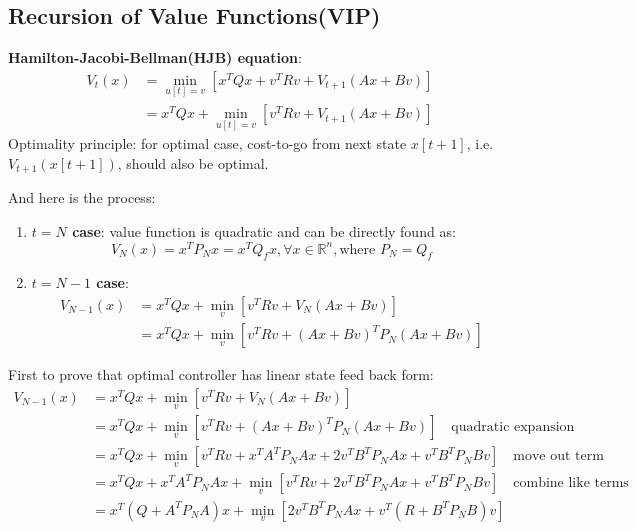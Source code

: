 \documentclass[10pt,a4paper,oneside]{article}
\begin{document}
\subsection{Recursion of Value Functions(VIP)}
\textbf{Hamilton-Jacobi-Bellman(HJB) equation}:
\[
\begin{aligned}
V_t(x) &= \min_{u[t]=v}[x^TQx+v^TRv+V_{t+1}(Ax+Bv)]\\
&= x^TQx+\min_{u[t]=v}[v^TRv+V_{t+1}(Ax+Bv)]
\end{aligned}
\]
Optimality principle: for optimal case, cost-to-go from next state $x[t+1]$, i.e. $V_{t+1}(x[t+1])$, should also be optimal. \\
And here is the process:
\begin{enumerate}
	\item \textbf{$t=N$ case}: value function is quadratic and can be directly found as:
	\[
	V_N(x)=x^T P_N x = x^T Q_f x,\forall x\in \mathbb{R}^n,\text{where }P_N=Q_f
	\]
	\item \textbf{$t=N-1$ case}:
	\[
	\begin{aligned}
	V_{N-1}(x) &= x^T Q x + \min_{v}[v^T R v+V_N(Ax+Bv)]\\
	&= x^T Q x + \min_{v}[v^T R v+(Ax+Bv)^T P_N (Ax+Bv)]
	\end{aligned}
	\]
\end{enumerate}
First to prove that optimal controller has linear state feed back form:
\begin{align*}
V_{N-1}(x) &= x^T Q x + \min_{v}[v^T R v+V_N(Ax+Bv)]\\
&= x^T Q x + \min_{v}[v^T R v+(Ax+Bv)^T P_N (Ax+Bv)] \quad \text{quadratic expansion}\\
&= x^T Q x + \min_{v}[v^T R v+ x^TA^TP_NAx + 2v^TB^TP_NAx + v^TB^TP_NBv] \quad \text{move out term}\\
&=  x^T Q x + x^TA^TP_NAx + \min_{v}[v^T R v  + 2v^TB^TP_NAx + v^TB^TP_NBv] \quad \text{combine like terms}\\
&= x^T(Q+A^TP_NA)x + \min_{v}[2v^TB^TP_NAx + v^T (R + B^TP_NB)v]
\end{align*}
\end{document}
